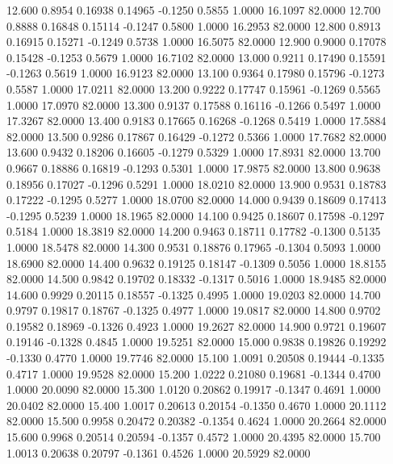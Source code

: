   12.600   0.8954   0.16938   0.14965  -0.1250   0.5855   1.0000  16.1097  82.0000
  12.700   0.8888   0.16848   0.15114  -0.1247   0.5800   1.0000  16.2953  82.0000
  12.800   0.8913   0.16915   0.15271  -0.1249   0.5738   1.0000  16.5075  82.0000
  12.900   0.9000   0.17078   0.15428  -0.1253   0.5679   1.0000  16.7102  82.0000
  13.000   0.9211   0.17490   0.15591  -0.1263   0.5619   1.0000  16.9123  82.0000
  13.100   0.9364   0.17980   0.15796  -0.1273   0.5587   1.0000  17.0211  82.0000
  13.200   0.9222   0.17747   0.15961  -0.1269   0.5565   1.0000  17.0970  82.0000
  13.300   0.9137   0.17588   0.16116  -0.1266   0.5497   1.0000  17.3267  82.0000
  13.400   0.9183   0.17665   0.16268  -0.1268   0.5419   1.0000  17.5884  82.0000
  13.500   0.9286   0.17867   0.16429  -0.1272   0.5366   1.0000  17.7682  82.0000
  13.600   0.9432   0.18206   0.16605  -0.1279   0.5329   1.0000  17.8931  82.0000
  13.700   0.9667   0.18886   0.16819  -0.1293   0.5301   1.0000  17.9875  82.0000
  13.800   0.9638   0.18956   0.17027  -0.1296   0.5291   1.0000  18.0210  82.0000
  13.900   0.9531   0.18783   0.17222  -0.1295   0.5277   1.0000  18.0700  82.0000
  14.000   0.9439   0.18609   0.17413  -0.1295   0.5239   1.0000  18.1965  82.0000
  14.100   0.9425   0.18607   0.17598  -0.1297   0.5184   1.0000  18.3819  82.0000
  14.200   0.9463   0.18711   0.17782  -0.1300   0.5135   1.0000  18.5478  82.0000
  14.300   0.9531   0.18876   0.17965  -0.1304   0.5093   1.0000  18.6900  82.0000
  14.400   0.9632   0.19125   0.18147  -0.1309   0.5056   1.0000  18.8155  82.0000
  14.500   0.9842   0.19702   0.18332  -0.1317   0.5016   1.0000  18.9485  82.0000
  14.600   0.9929   0.20115   0.18557  -0.1325   0.4995   1.0000  19.0203  82.0000
  14.700   0.9797   0.19817   0.18767  -0.1325   0.4977   1.0000  19.0817  82.0000
  14.800   0.9702   0.19582   0.18969  -0.1326   0.4923   1.0000  19.2627  82.0000
  14.900   0.9721   0.19607   0.19146  -0.1328   0.4845   1.0000  19.5251  82.0000
  15.000   0.9838   0.19826   0.19292  -0.1330   0.4770   1.0000  19.7746  82.0000
  15.100   1.0091   0.20508   0.19444  -0.1335   0.4717   1.0000  19.9528  82.0000
  15.200   1.0222   0.21080   0.19681  -0.1344   0.4700   1.0000  20.0090  82.0000
  15.300   1.0120   0.20862   0.19917  -0.1347   0.4691   1.0000  20.0402  82.0000
  15.400   1.0017   0.20613   0.20154  -0.1350   0.4670   1.0000  20.1112  82.0000
  15.500   0.9958   0.20472   0.20382  -0.1354   0.4624   1.0000  20.2664  82.0000
  15.600   0.9968   0.20514   0.20594  -0.1357   0.4572   1.0000  20.4395  82.0000
  15.700   1.0013   0.20638   0.20797  -0.1361   0.4526   1.0000  20.5929  82.0000
